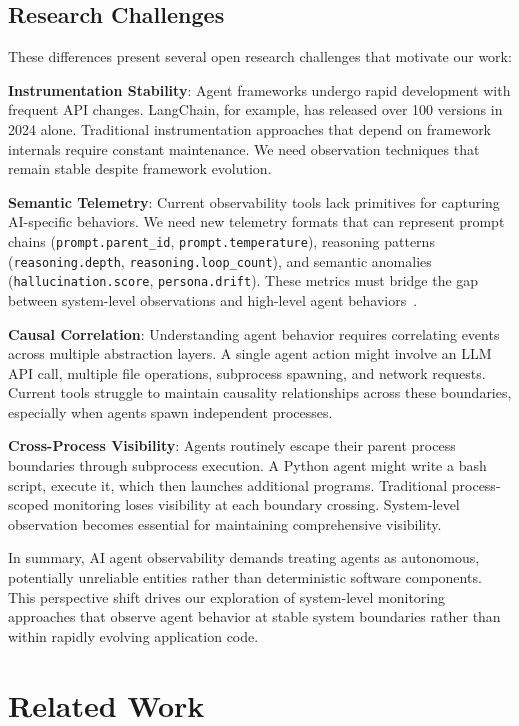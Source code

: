 \documentclass[sigplan,screen，review,9pt]{acmart}
\begin{document}
\subsection{Research Challenges}

These differences present several open research challenges that motivate our work:

\textbf{Instrumentation Stability}: Agent frameworks undergo rapid development with frequent API changes. LangChain, for example, has released over 100 versions in 2024 alone. Traditional instrumentation approaches that depend on framework internals require constant maintenance. We need observation techniques that remain stable despite framework evolution.

\textbf{Semantic Telemetry}: Current observability tools lack primitives for capturing AI-specific behaviors. We need new telemetry formats that can represent prompt chains (\texttt{prompt.parent\_id}, \texttt{prompt.temperature}), reasoning patterns (\texttt{reasoning.depth}, \texttt{reasoning.loop\_count}), and semantic anomalies (\texttt{hallucination.score}, \texttt{persona.drift}). These metrics must bridge the gap between system-level observations and high-level agent behaviors~\cite{semconv}.

\textbf{Causal Correlation}: Understanding agent behavior requires correlating events across multiple abstraction layers. A single agent action might involve an LLM API call, multiple file operations, subprocess spawning, and network requests. Current tools struggle to maintain causality relationships across these boundaries, especially when agents spawn independent processes.

\textbf{Cross-Process Visibility}: Agents routinely escape their parent process boundaries through subprocess execution. A Python agent might write a bash script, execute it, which then launches additional programs. Traditional process-scoped monitoring loses visibility at each boundary crossing. System-level observation becomes essential for maintaining comprehensive visibility.

In summary, AI agent observability demands treating agents as autonomous, potentially unreliable entities rather than deterministic software components. This perspective shift drives our exploration of system-level monitoring approaches that observe agent behavior at stable system boundaries rather than within rapidly evolving application code.


\section{Related Work}
\end{document}
